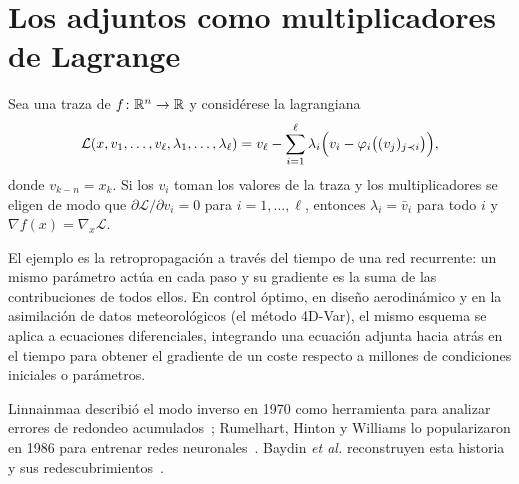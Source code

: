 \section{Los adjuntos como multiplicadores de Lagrange}

\begin{teorema}\label{teo:lagrange}
Sea una traza de $f\colon\mathbb{R}^{n}\to\mathbb{R}$ y considérese la lagrangiana
\[
\mathcal L(x,v_1,\dots,v_\ell,\lambda_1,\dots,\lambda_\ell)=v_\ell-\sum_{i=1}^{\ell}\lambda_i\Bigl(v_i-\varphi_i\bigl((v_j)_{j\prec i}\bigr)\Bigr),
\]
donde $v_{k-n}=x_k$. Si los $v_i$ toman los valores de la traza y los multiplicadores se eligen de modo que $\partial\mathcal L/\partial v_i=0$ para $i=1,\dots,\ell$, entonces $\lambda_i=\bar v_i$ para todo $i$ y $\nabla f(x)=\nabla_x\mathcal L$.
\end{teorema}

\addtocounter{definicion}{1}%

El ejemplo es la retropropagación a través del tiempo de una red recurrente: un mismo parámetro actúa en cada paso y su gradiente es la suma de las contribuciones de todos ellos. En control óptimo, en diseño aerodinámico y en la asimilación de datos meteorológicos (el método 4D-Var), el mismo esquema se aplica a ecuaciones diferenciales, integrando una ecuación adjunta hacia atrás en el tiempo para obtener el gradiente de un coste respecto a millones de condiciones iniciales o parámetros.

\begin{observacion}[Historia]
Linnainmaa describió el modo inverso en 1970 como herramienta para analizar errores de redondeo acumulados~\cite{linnainmaa}; Rumelhart, Hinton y Williams lo popularizaron en 1986 para entrenar redes neuronales~\cite{rumelhart}. Baydin \emph{et al.} reconstruyen esta historia y sus redescubrimientos~\cite[§3.3]{baydin}.
\end{observacion}

